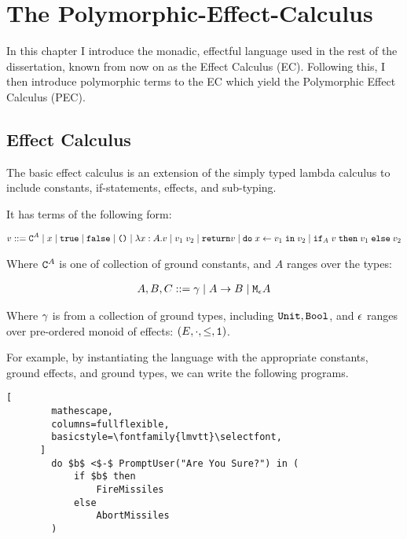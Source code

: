 \documentclass{Report}
\begin{document}
\chapter{The Polymorphic-Effect-Calculus}
In this chapter I introduce the monadic, effectful language used in the rest of the dissertation, known from now on as the Effect Calculus (EC). Following this, I then introduce polymorphic terms to the EC which yield the Polymorphic Effect Calculus (PEC).

\section{Effect Calculus}

The basic effect calculus is an extension of the simply typed lambda calculus to include constants, if-statements, effects, and sub-typing.


It has terms of the following form:

\begin{align}
    v ::= \texttt{C}^{A} \mid x\mid \texttt{true} \mid\texttt{false} \mid\texttt{()}\mid\lambda x : A. v\mid v_1\; v_2\mid\texttt{return} v\mid\texttt{do}\; x \leftarrow v_1 \;\texttt{in}\; v_2\mid\texttt{if}_{A}\; v\; \texttt{then}\; v_1 \;\texttt{else} \; v_2 
\end{align}

Where $\texttt{C}^{A}$ is one of collection of ground constants, and $A$ ranges over the types:

\begin{align}
    A, B, C ::= \gamma\mid A\rightarrow B \mid\texttt{M}_{\epsilon}{A}
\end{align}

Where $\gamma$ is from a collection of ground types, including $\texttt{Unit}, \texttt{Bool}$, and $\epsilon$ ranges over pre-ordered monoid of effects: $(E, \cdot, \leq, \texttt{1})$.

For example, by instantiating the language with the appropriate constants, ground effects, and ground types, we can write the following programs.

\begin{framed}
    \begin{lstlisting}[
        mathescape,
        columns=fullflexible,
        basicstyle=\fontfamily{lmvtt}\selectfont,
      ]
        do $b$ <$-$ PromptUser("Are You Sure?") in (
            if $b$ then
                FireMissiles
            else
                AbortMissiles
        )
    \end{lstlisting}        
\end{framed}
\end{document}
